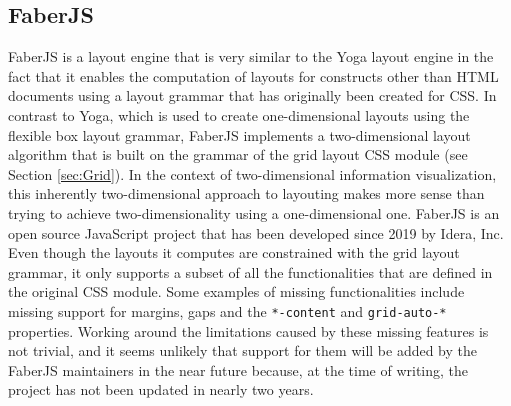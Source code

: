 \subsection{FaberJS}

FaberJS \parencite{FaberJS} is a layout engine that is very similar to the Yoga layout engine in the fact that it enables the computation of layouts for constructs other than HTML documents using a layout grammar that has originally been created for CSS. In contrast to Yoga, which is used to create one-dimensional layouts using the flexible box layout grammar, FaberJS implements a two-dimensional layout algorithm that is built on the grammar of the grid layout CSS module (see Section \ref{sec:Grid}). In the context of two-dimensional information visualization, this inherently two-dimensional approach to layouting makes more sense than trying to achieve two-dimensionality using a one-dimensional one. FaberJS is an open source JavaScript project that has been developed since 2019 by Idera, Inc. Even though the layouts it computes are constrained with the grid layout grammar, it only supports a subset of all the functionalities that are defined in the original CSS module. Some examples of missing functionalities include missing support for margins, gaps and the \lstinline{*-content} and \lstinline{grid-auto-*} properties. Working around the limitations caused by these missing features is not trivial, and it seems unlikely that support for them will be added by the FaberJS maintainers in the near future because, at the time of writing, the project has not been updated in nearly two years. 
